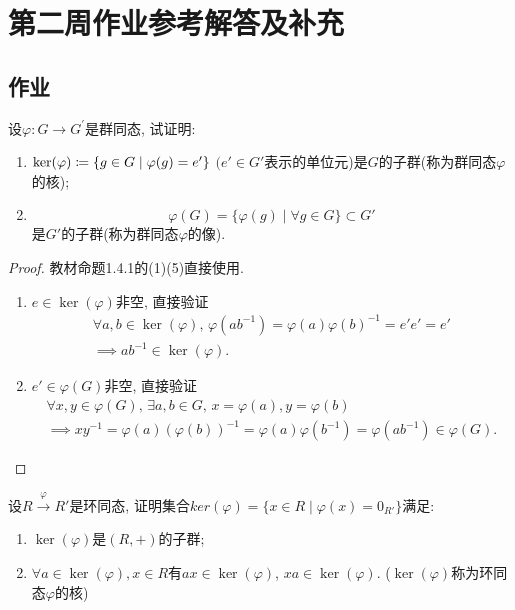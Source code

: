 \documentclass{../solutions-cn}
\begin{document}
\section*{第二周作业参考解答及补充}

\subsection*{作业}

\begin{exercise}[习题1.4.1]
    设$\varphi:G\to G^\prime$是群同态, 试证明:
    \begin{enumerate}[(1)]
        \item $\ker(\varphi) \mathrel{\coloneqq} \{g \in G \mid \varphi(g) = e'\}$ $(e' \in G'$表示的单位元)是$G$的子群(称为群同态$\varphi$的核);
        \item 
        \[
            \varphi(G) = \{\varphi(g) \mid \forall g \in G\} \subset G'
        \]
        是$G'$的子群(称为群同态$\varphi$的像).
    \end{enumerate}
\end{exercise}

\begin{proof}
    教材命题1.4.1的(1)(5)直接使用.
\begin{enumerate}[(1)]
    \item $e \in \ker(\varphi)$非空, 直接验证
    \[
    \begin{gathered}
        \forall a, b \in \ker(\varphi),\, \varphi(ab^{-1}) = \varphi(a)\varphi(b)^{-1} = e'e' = e'\\
        \implies ab^{-1} \in \ker(\varphi).
    \end{gathered}
    \]
    \item $e' \in \varphi(G)$非空, 直接验证
    \[
    \begin{gathered}
        \forall x, y \in \varphi(G),\, \exists a, b \in G,\, x = \varphi(a), y = \varphi(b)\\
        \implies xy^{-1} = \varphi(a)(\varphi(b))^{-1} = \varphi(a)\varphi(b^{-1}) = \varphi(ab^{-1}) \in \varphi(G).
    \end{gathered}
    \]
\end{enumerate}
\end{proof}

\begin{exercise}[习题1.4.3]
    设$R \overset{\varphi}\to R'$是环同态, 证明集合$ker(\varphi) = \{x \in R \mid \varphi(x) = 0_{R'}\}$满足:
    \begin{enumerate}[(1)]
        \item $\ker(\varphi)$是$(R, +)$的子群;
        \item $\forall a \in \ker (\varphi), x \in R$有$ax \in \ker(\varphi)$, $xa \in \ker (\varphi)$. ($\ker(\varphi)$称为环同态$\varphi$的核)
    \end{enumerate}
\end{exercise}
\end{document}
